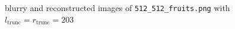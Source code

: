\begin{enumerate}
\begin{figure}[H]
{    }
    \caption{blurry and reconstructed images of \lstinline{512_512_fruits.png} with $l_{\text{trunc}} = r_{\text{trunc}} = 203$}
\end{figure}
\end{enumerate}







